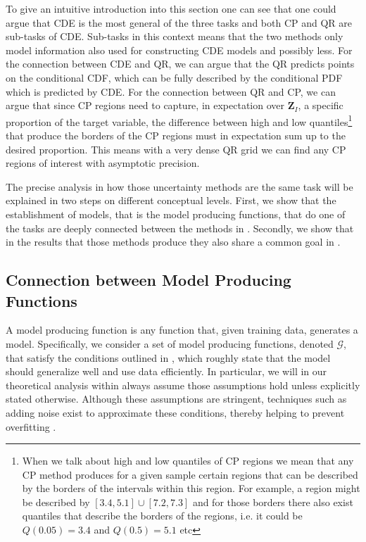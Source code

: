 To give an intuitive introduction into this section one can see that one could argue that CDE is the most general of the three tasks and both CP and QR are sub-tasks of CDE. Sub-tasks in this context means that the two methods only model information also used for constructing CDE models and possibly less. For the connection between CDE and QR, we can argue that the QR predicts points on the conditional CDF, which can be fully described by the conditional PDF which is predicted by CDE. For the connection between QR and CP, we can argue that since CP regions need to capture, in expectation over $\mathbf{Z}_I$, a specific proportion of the target variable, the difference between high and low quantiles\footnote{When we talk about high and low quantiles of CP regions we mean that any CP method produces for a given sample certain regions that can be described by the borders of the intervals within this region. For example, a region might be described by $[3.4, 5.1] \cup [7.2, 7.3]$ and for those borders there also exist quantiles that describe the borders of the regions, i.e. it could be $Q(0.05) = 3.4$ and $Q(0.5) = 5.1$ etc} that produce the borders of the CP regions must in expectation sum up to the desired proportion. This means with a very dense QR grid we can find any CP regions of interest with asymptotic precision.

The precise analysis in how those uncertainty methods are the same task will be explained in two steps on different conceptual levels. First, we show that the establishment of models, that is the model producing functions, that do one of the tasks are deeply connected between the methods in . Secondly, we show that in the results that those methods produce they also share a common goal in .

\subsection{Connection between Model Producing Functions}\label{sec:connection_model_producing}

A model producing function is any function that, given training data, generates a model. Specifically, we consider a set of model producing functions, denoted $\mathcal{G}$, that satisfy the conditions outlined in , which roughly state that the model should generalize well and use data efficiently. In particular, we will in our theoretical analysis within  always assume those assumptions hold unless explicitly stated otherwise. Although these assumptions are stringent, techniques such as adding noise exist to approximate these conditions, thereby helping to prevent overfitting \cite{rothfuss2019noise}.

